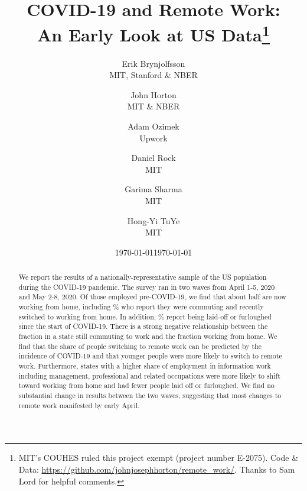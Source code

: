 \documentclass[12pt]{article}
\newcommand{\covid}{COVID-19}
\begin{document}
 



\title{COVID-19 and Remote Work:\\ An Early Look at US Data\footnote{
    MIT's COUHES ruled this project exempt (project number E-2075).
    {Code \& Data: \href{https://github.com/johnjosephhorton/remote\_work/}{https://github.com/johnjosephhorton/remote\_work/}}.
    Thanks to Sam Lord for helpful comments. 
  }}

\date{\today}

\date{\today}

\author{Erik Brynjolfsson\\MIT, Stanford \& NBER \and John Horton\\MIT \& NBER \and Adam Ozimek\\Upwork \and Daniel Rock\\MIT \and Garima Sharma\\MIT \and Hong-Yi TuYe\\MIT}


\maketitle
 
\begin{abstract}
  \noindent 
  We report the results of a nationally-representative sample of the US population during the \covid{} pandemic.  The survey ran in two waves from April 1-5, 2020 and May 2-8, 2020. Of those employed pre-COVID-19, we find that about half are now working from home, including \WFH{}\% who report they were commuting and recently switched to working from home.
  In addition, \LaidOff{}\% report being laid-off or furloughed since the start of COVID-19. There is a strong negative relationship between the fraction in a state still commuting to work and the fraction working from home. We find that the share of people switching to remote work can be predicted by the incidence of \covid{} and that younger people were more likely to switch to remote work.  Furthermore, states with a higher share of employment in information work including management, professional and related occupations were more likely to  shift toward working from home and had fewer people laid off or furloughed.  We find no substantial change in results between the two waves, suggesting that most changes to remote work manifested by early April.
  \newline 
\end{abstract} 
\end{document}
